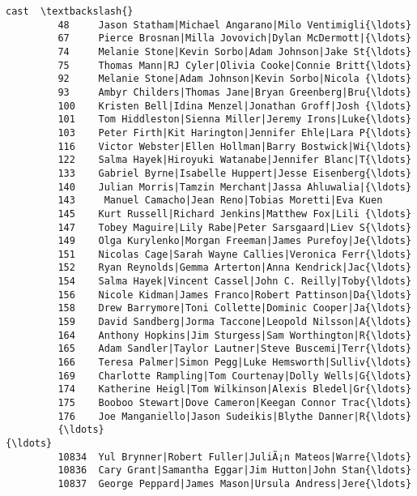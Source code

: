 \documentclass[11pt]{article}
\begin{document}
\begin{Verbatim}[commandchars=\\\{\}]
                                                             cast  \textbackslash{}
         48     Jason Statham|Michael Angarano|Milo Ventimigli{\ldots}   
         67     Pierce Brosnan|Milla Jovovich|Dylan McDermott|{\ldots}   
         74     Melanie Stone|Kevin Sorbo|Adam Johnson|Jake St{\ldots}   
         75     Thomas Mann|RJ Cyler|Olivia Cooke|Connie Britt{\ldots}   
         92     Melanie Stone|Adam Johnson|Kevin Sorbo|Nicola {\ldots}   
         93     Ambyr Childers|Thomas Jane|Bryan Greenberg|Bru{\ldots}   
         100    Kristen Bell|Idina Menzel|Jonathan Groff|Josh {\ldots}   
         101    Tom Hiddleston|Sienna Miller|Jeremy Irons|Luke{\ldots}   
         103    Peter Firth|Kit Harington|Jennifer Ehle|Lara P{\ldots}   
         116    Victor Webster|Ellen Hollman|Barry Bostwick|Wi{\ldots}   
         122    Salma Hayek|Hiroyuki Watanabe|Jennifer Blanc|T{\ldots}   
         133    Gabriel Byrne|Isabelle Huppert|Jesse Eisenberg{\ldots}   
         140    Julian Morris|Tamzin Merchant|Jassa Ahluwalia|{\ldots}   
         143     Manuel Camacho|Jean Reno|Tobias Moretti|Eva Kuen   
         145    Kurt Russell|Richard Jenkins|Matthew Fox|Lili {\ldots}   
         147    Tobey Maguire|Lily Rabe|Peter Sarsgaard|Liev S{\ldots}   
         149    Olga Kurylenko|Morgan Freeman|James Purefoy|Je{\ldots}   
         151    Nicolas Cage|Sarah Wayne Callies|Veronica Ferr{\ldots}   
         152    Ryan Reynolds|Gemma Arterton|Anna Kendrick|Jac{\ldots}   
         154    Salma Hayek|Vincent Cassel|John C. Reilly|Toby{\ldots}   
         156    Nicole Kidman|James Franco|Robert Pattinson|Da{\ldots}   
         158    Drew Barrymore|Toni Collette|Dominic Cooper|Ja{\ldots}   
         159    David Sandberg|Jorma Taccone|Leopold Nilsson|A{\ldots}   
         164    Anthony Hopkins|Jim Sturgess|Sam Worthington|R{\ldots}   
         165    Adam Sandler|Taylor Lautner|Steve Buscemi|Terr{\ldots}   
         166    Teresa Palmer|Simon Pegg|Luke Hemsworth|Sulliv{\ldots}   
         169    Charlotte Rampling|Tom Courtenay|Dolly Wells|G{\ldots}   
         174    Katherine Heigl|Tom Wilkinson|Alexis Bledel|Gr{\ldots}   
         175    Booboo Stewart|Dove Cameron|Keegan Connor Trac{\ldots}   
         176    Joe Manganiello|Jason Sudeikis|Blythe Danner|R{\ldots}   
         {\ldots}                                                  {\ldots}   
         10834  Yul Brynner|Robert Fuller|JuliÃ¡n Mateos|Warre{\ldots}   
         10836  Cary Grant|Samantha Eggar|Jim Hutton|John Stan{\ldots}   
         10837  George Peppard|James Mason|Ursula Andress|Jere{\ldots}   

\end{Verbatim}
\end{document}
